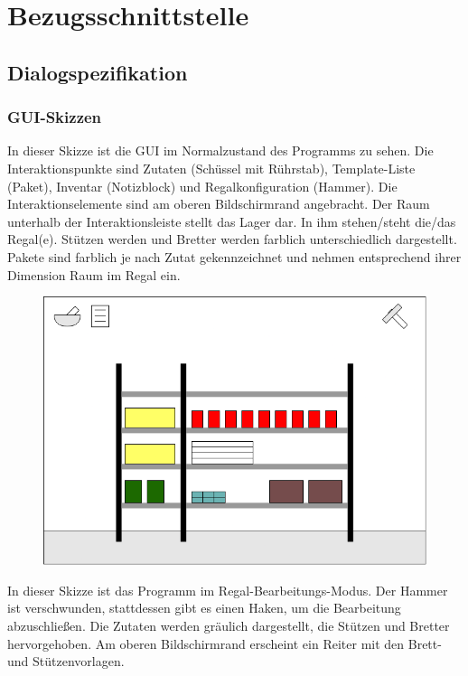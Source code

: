 \section{Bezugsschnittstelle}
\subsection{Dialogspezifikation}
\subsubsection{GUI-Skizzen}
\begingroup
In dieser Skizze ist die GUI im Normalzustand
des Programms zu sehen. Die Interaktionspunkte sind
Zutaten (Schüssel mit Rührstab), Template-Liste (Paket), Inventar (Notizblock)
und Regalkonfiguration (Hammer). Die Interaktionselemente sind am oberen
Bildschirmrand angebracht.
Der Raum unterhalb der Interaktionsleiste stellt
das Lager dar. In ihm stehen/steht die/das Regal(e). Stützen werden und Bretter
werden farblich unterschiedlich dargestellt. Pakete sind farblich je nach Zutat gekennzeichnet
und nehmen entsprechend ihrer Dimension Raum im Regal ein.
\endgroup
\begin{figure}[h!]
    \includegraphics[width=\linewidth]{images/GUI-Skizze.png}
\end{figure}
\newpage
\begingroup
In dieser Skizze ist das Programm im Regal-Bearbeitungs-Modus. Der Hammer ist verschwunden, stattdessen gibt es einen Haken,
um die Bearbeitung abzuschließen. Die Zutaten werden gräulich dargestellt, die Stützen und Bretter hervorgehoben. Am oberen 
Bildschirmrand erscheint ein Reiter mit den Brett- und Stützenvorlagen.
